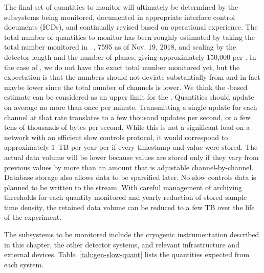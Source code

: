 The final set of quantities to monitor will ultimately be determined
by the subsystems being monitored, documented in appropriate  interface control documents (ICDs), and continually revised based on operational experience.  The total number of quantities to monitor has been roughly estimated by taking the total number monitored in ~\cite{pdspdcs_proc}, 7595 as of Nov. 19, 2018, and scaling by the detector length and the number of planes, giving approximately 150,000 per . In the case of , we do not have the exact total number monitored yet, but the expectation is that the  numbers should not deviate substantially from  and in fact maybe lower since the total number of channels is lower. We think the -based estimate can be considered as an upper limit for the .
Quantities should update on average no more than once per minute.
Transmitting a single update for each channel at that rate translates to a few thousand updates per second, or a few tens of thousands of bytes per second. While this is not a significant load on a network with an efficient slow controls protocol, it would correspond to approximately \SI{1}{TB} per year per  if every timestamp and value were stored.
The actual data volume will be lower because values are stored only if they vary from previous values by more than an amount that is adjustable channel-by-channel.
Database storage also allows data to be sparsified later.
No slow controls data is planned to be written to the  stream.
With careful management of archiving thresholds for each quantity monitored and yearly reduction of stored sample time density, the retained data volume can be reduced to a few TB over the life of the experiment.

The subsystems
to be monitored include the 
cryogenic instrumentation
described in this chapter, the other detector systems, and relevant
infrastructure and external devices. Table~\ref{tab:gen-slow-quant}
lists the quantities expected from each system.

